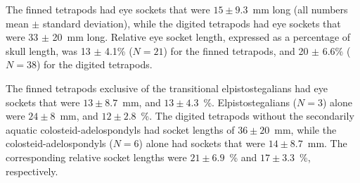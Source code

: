  The finned tetrapods had eye sockets that were $15 \pm 9.3$~mm long (all numbers mean $\pm$ standard deviation), while the digited tetrapods had eye sockets that were 33 $\pm$ 20~mm long. Relative eye socket length, expressed as a percentage of skull length, was 13 $\pm$ 4.1\% ($N=21$) for the finned tetrapods, and 20 $\pm$  6.6\% ($N=38$) for the digited tetrapods.

The finned tetrapods exclusive of the transitional elpistostegalians had eye sockets that were $13 \pm 8.7$~mm, and  $13 \pm 4.3$~\%. Elpistostegalians ($N=3$) alone were $24 \pm 8$~mm, and $12 \pm 2.8$~\%. The digited tetrapods without the secondarily aquatic colosteid-adelospondyls had socket lengths of $36 \pm 20$~mm, while the colosteid-adelospondyls ($N=6$) alone had sockets that were $14 \pm 8.7$~mm. The corresponding relative socket lengths were $21 \pm 6.9$~\% and $17 \pm 3.3$~\%, respectively.

